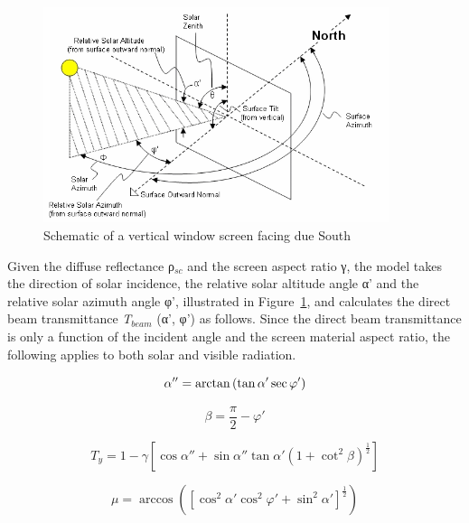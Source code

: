 \begin{figure}[hbtp] %
\centering
\includegraphics[width=0.9\textwidth, height=0.9\textheight, keepaspectratio=true]{media/image1154.png}
\caption{Schematic of a vertical window screen facing due South \protect \label{fig:schematic-of-a-vertical-window-screen-facing}}
\end{figure}

Given the diffuse reflectance ρ\(_{sc}\) and the screen aspect ratio γ, the model takes the direction of solar incidence, the relative solar altitude angle α' and the relative solar azimuth angle φ', illustrated in Figure~\ref{fig:schematic-of-a-vertical-window-screen-facing}, and calculates the direct beam transmittance \emph{T\(_{beam}\)} (α', φ') as follows. Since the direct beam transmittance is only a function of the incident angle and the screen material aspect ratio, the following applies to both solar and visible radiation.

\begin{equation}
\alpha '' = {\rm{arctan}}\left( {\tan \alpha '\sec \varphi '} \right)
\end{equation}

\begin{equation}
\beta  = \frac{\pi }{2} - \varphi '
\end{equation}

\begin{equation}
{T_y} = 1 - \gamma \left[ {\cos \alpha '' + \sin \alpha ''\tan \alpha '{{\left( {1 + {{\cot }^2}\beta } \right)}^{\frac{1}{2}}}} \right]
\end{equation}

\begin{equation}
\mu  = \arccos \left( {{{\left[ {{{\cos }^2}\alpha '{{\cos }^2}\varphi ' + {{\sin }^2}\alpha '} \right]}^{\frac{1}{2}}}} \right)
\end{equation}

